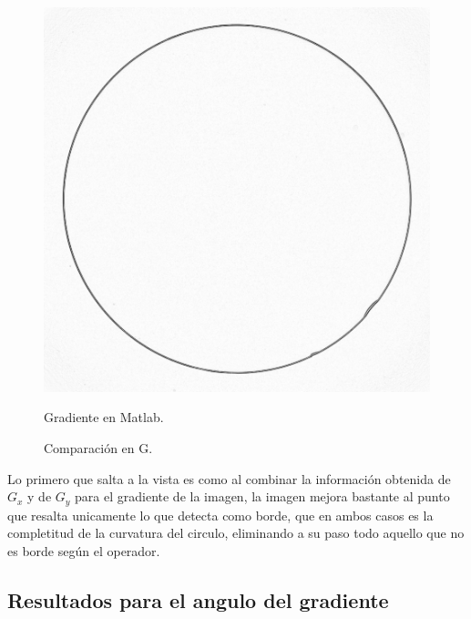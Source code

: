 \documentclass[11pt, letterpaper]{article}
\begin{document}
\begin{figure}[h]
\begin{minipage}{0.48\textwidth}
		\centering
		\includegraphics[width=\textwidth]{IMG/q3.png} %
		\caption{Gradiente en Matlab.}
		\label{fig:img7}
	\end{minipage}
	
	\caption{Comparación en G.}
	\label{fig:comparacion en G}
\end{figure}		

Lo primero que salta a la vista es como al combinar la información obtenida de $G_x$ y de $G_y$ para el gradiente de la imagen, la imagen mejora bastante al punto que resalta unicamente lo que detecta como borde, que en ambos casos es la completitud de la curvatura del circulo, eliminando a su paso todo aquello que no es borde según el operador.

\newpage

\subsection{Resultados para el angulo del gradiente}
\end{document}
